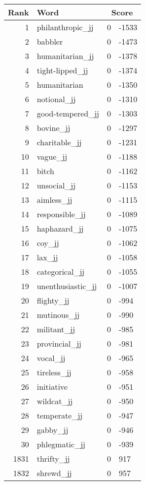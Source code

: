 \begin{longtable}[!htbp]{| rlr@{.}l |}
    \hline
    \textbf{Rank} & \textbf{Word} & \multicolumn{2}{c|}{\textbf{Score}} \\
    \hline
    \endhead
    1 & philanthropic\_jj & 0 & -1533 \\
    2 & babbler & 0 & -1473 \\
    3 & humanitarian\_jj & 0 & -1378 \\
    4 & tight-lipped\_jj & 0 & -1374 \\
    5 & humanitarian & 0 & -1350 \\
    6 & notional\_jj & 0 & -1310 \\
    7 & good-tempered\_jj & 0 & -1303 \\
    8 & bovine\_jj & 0 & -1297 \\
    9 & charitable\_jj & 0 & -1231 \\
    10 & vague\_jj & 0 & -1188 \\
    11 & bitch & 0 & -1162 \\
    12 & unsocial\_jj & 0 & -1153 \\
    13 & aimless\_jj & 0 & -1115 \\
    14 & responsible\_jj & 0 & -1089 \\
    15 & haphazard\_jj & 0 & -1075 \\
    16 & coy\_jj & 0 & -1062 \\
    17 & lax\_jj & 0 & -1058 \\
    18 & categorical\_jj & 0 & -1055 \\
    19 & unenthusiastic\_jj & 0 & -1007 \\
    20 & flighty\_jj & 0 & -994 \\
    21 & mutinous\_jj & 0 & -990 \\
    22 & militant\_jj & 0 & -985 \\
    23 & provincial\_jj & 0 & -981 \\
    24 & vocal\_jj & 0 & -965 \\
    25 & tireless\_jj & 0 & -958 \\
    26 & initiative & 0 & -951 \\
    27 & wildcat\_jj & 0 & -950 \\
    28 & temperate\_jj & 0 & -947 \\
    29 & gabby\_jj & 0 & -946 \\
    30 & phlegmatic\_jj & 0 & -939 \\
    1831 & thrifty\_jj & 0 & 917 \\
    1832 & shrewd\_jj & 0 & 957 \\

\end{longtable}
